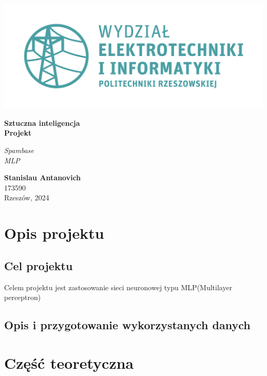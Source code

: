 \documentclass[a4paper, 10pt]{article}
\begin{document}
\begin{titlepage}
\begin{center}
	\includegraphics[scale=0.7]{logo.png}

	\vspace*{4cm}
	\textbf{Sztuczna inteligencja\\ Projekt}

	\vspace{1.5cm}
	\textit{Spambase\\MLP}

	\vspace{1.5cm}
	\textbf{Stanislau Antanovich}\\
	173590\\

	\vspace{6.5cm}
	Rzeszów, 2024
\end{center}
\end{titlepage}

\tableofcontents

\listoffigures


\newpage

\section{Opis projektu}
\subsection{Cel projektu}

Celem projektu jest zastosowanie sieci neuronowej typu MLP(Multilayer perceptron)
\subsection{Opis i przygotowanie wykorzystanych danych}

\section{Część teoretyczna}
\end{document}
